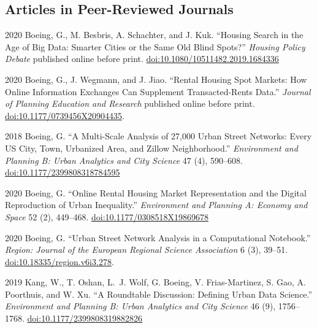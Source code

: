 \documentclass[12pt,letterpaper]{report}
\begin{document}
    \subsection*{Articles in Peer-Reviewed Journals}

    \begin{tablist}
    	
    	\item[2020] \tab Boeing, G., M. Besbris, A. Schachter, and J. Kuk. \enquote{Housing Search in the Age of Big Data: Smarter Cities or the Same Old Blind Spots?} \textit{Housing Policy Debate} published online before print. \href{https://doi.org/10.1080/10511482.2019.1684336}{doi:10.1080/10511482.2019.1684336}
    	
    	\item[2020] \tab Boeing, G., J. Wegmann, and J. Jiao. \enquote{Rental Housing Spot Markets: How Online Information Exchanges Can Supplement Transacted-Rents Data.} \textit{Journal of Planning Education and Research} published online before print. \href{https://doi.org/10.1177/0739456X20904435}{doi:10.1177/0739456X20904435}.
    	
    	\item[2018] \tab Boeing, G. \enquote{A Multi-Scale Analysis of 27,000 Urban Street Networks: Every US City, Town, Urbanized Area, and Zillow Neighborhood.} \textit{Environment and Planning B: Urban Analytics and City Science} 47 (4), 590--608. \href{https://doi.org/10.1177/2399808318784595}{doi:10.1177/2399808318784595}
    	    	
    	\item[2020] \tab Boeing, G. \enquote{Online Rental Housing Market Representation and the Digital Reproduction of Urban Inequality.} \textit{Environment and Planning A: Economy and Space} 52 (2), 449--468. \href{https://doi.org/10.1177/0308518X19869678}{doi:10.1177/0308518X19869678}
    	
    	\item[2020] \tab Boeing, G. \enquote{Urban Street Network Analysis in a Computational Notebook.} \textit{Region: Journal of the European Regional Science Association} 6 (3), 39--51. \href{https://doi.org/10.18335/region.v6i3.278}{doi:10.18335/region.v6i3.278}.
    	
    	\item[2019] \tab Kang, W., T. Oshan, L.~J. Wolf, G. Boeing, V. Frias-Martinez, S. Gao, A. Poorthuis, and W. Xu. \enquote{A Roundtable Discussion: Defining Urban Data Science.} \textit{Environment and Planning B: Urban Analytics and City Science} 46 (9), 1756--1768. \href{https://doi.org/10.1177/2399808319882826}{doi:10.1177/2399808319882826}
    	

\end{tablist}
\end{document}
